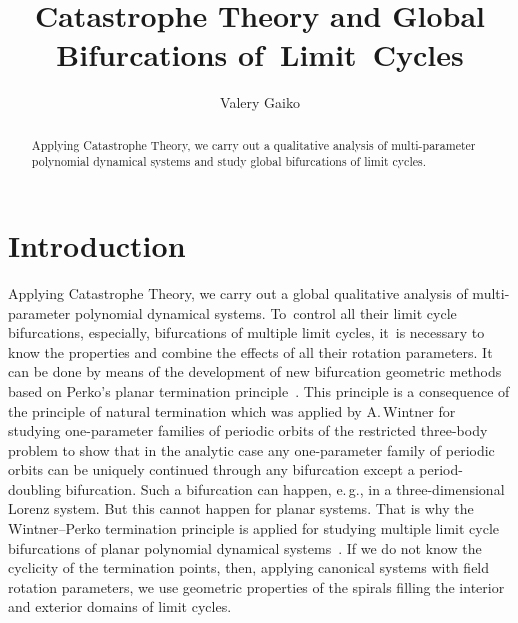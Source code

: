 \documentclass[12pt]{llncs}
\begin{document}
\fi

\title{Catastrophe Theory and Global Bifurcations of~Limit~Cycles}

\author{Valery Gaiko}

\maketitle

\begin{abstract}
Applying Catastrophe Theory, we carry out a qualitative analysis of multi-parameter
polynomial dynamical systems and study global bifurcations of limit cycles.

\end{abstract}

\section{Introduction}

Applying Catastrophe Theory, we carry out a global qualitative analysis of multi-parameter
polynomial dynamical systems. To~control all their limit cycle bifurcations, especially,
bifurcations of multiple limit cycles, it~is necessary to know the properties and combine
the effects of all their rotation parameters. It can be done by means of the development of
new bifurcation geometric methods based on Perko's planar termination principle~\cite{gaiko1}.
This principle is a consequence of the principle of natural termination which
was applied by A.\,Wintner for studying one-parameter families of periodic
orbits of the restricted three-body problem to show that in the analytic case any
one-parameter family of periodic orbits can be uniquely continued through any bifurcation
except a period-doubling bifurcation. Such a bifurcation can happen, e.\,g., in a
three-dimensional Lorenz system. But this cannot happen for planar systems. That is why
the Wintner--Perko termination principle is applied for studying multiple limit cycle
bifurcations of planar polynomial dynamical systems~\cite{gaiko1}.
If we do not know the cyclicity of the termination points, then, applying canonical systems with
field rotation parameters, we use geometric properties of the spirals filling the interior and
exterior domains of limit cycles.
\end{document}
